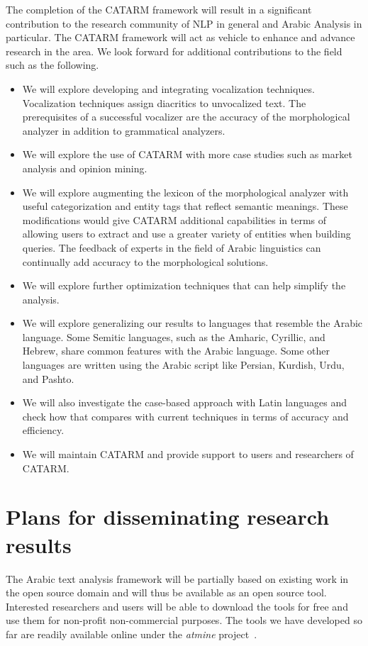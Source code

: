\documentclass[12pt]{article}
\begin{document}
The completion of the CATARM framework will result in a 
significant contribution to the research community of 
NLP in general and Arabic Analysis in particular. 
The CATARM framework will act as vehicle to enhance and advance 
research in the area. 
We look forward for additional contributions to the field 
such as the following.
\begin{itemize}
\item We will explore developing and integrating vocalization
techniques. 
Vocalization techniques assign diacritics to unvocalized text. 
The prerequisites of a successful vocalizer are the accuracy of 
the morphological analyzer in addition to grammatical analyzers. 
\item We will explore the use of CATARM with more case studies
such as market analysis and opinion mining.
\item We will explore augmenting the lexicon of the
morphological analyzer with useful categorization and entity 
tags that reflect semantic meanings. 
These modifications would give CATARM additional capabilities in 
terms of allowing users to extract and use a greater variety of 
entities when building queries. 
The feedback of experts in the field of Arabic linguistics can 
continually add accuracy to the morphological solutions.  
\item We will explore further optimization techniques
that can help simplify the analysis. 
\item We will explore generalizing our results to languages 
that resemble the Arabic language. 
Some Semitic languages, such as the Amharic, Cyrillic, and Hebrew,
share common features with the Arabic 
language. Some other languages are written using the 
Arabic script like Persian, Kurdish, Urdu, and Pashto. 
\item We will also investigate the case-based approach with
Latin languages and check how that compares with current techniques
in terms of accuracy and efficiency.
\item We will maintain CATARM and provide support to users and 
researchers of CATARM.
\end{itemize}


\section{Plans for disseminating research results}
\label{s:dissem}

The Arabic text analysis framework will be partially based on 
existing work in the open source domain and will thus be available 
as an open source tool. 
Interested researchers and users will be able to download the 
tools for free and use them for non-profit non-commercial 
purposes.  
The tools we have developed so far are readily available 
online under the {\em atmine} project~\cite{ATMine09}.
\end{document}
